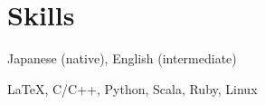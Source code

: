 \documentclass[10pt]{article}
\begin{document}



\section{Skills}
\begin{description}[align=left,leftmargin=2.5cm,style=multiline]
  \setlength{\itemsep}{0pt}
  \item [Languages] Japanese (native), English (intermediate)
  \item [Coding] \LaTeX, C/C++, Python, Scala, Ruby, Linux
\end{description}
\end{document}

